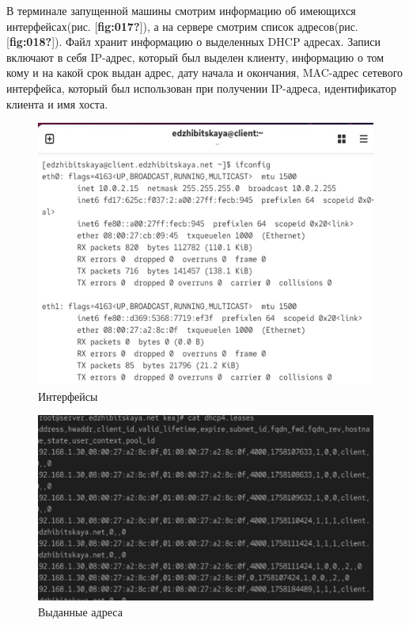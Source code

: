 \documentclass[
  english,
  russian,
  12pt,
  a4paper,
  DIV=11,
  numbers=noendperiod]{scrreprt}
\begin{document}
В терминале запущенной машины смотрим информацию об имеющихся
интерфейсах(рис. {[}\textbf{fig:017?}{]}), а на сервере смотрим список
адресов(рис. {[}\textbf{fig:018?}{]}). Файл хранит информацию о
выделенных DHCP адресах. Записи включают в себя IP-адрес, который был
выделен клиенту, информацию о том кому и на какой срок выдан адрес, дату
начала и окончания, MAC-адрес сетевого интерфейса, который был
использован при получении IP-адреса, идентификатор клиента и имя хоста.

\begin{figure}

{\centering \includegraphics[width=0.7\linewidth,height=\textheight,keepaspectratio]{image/17.jpg}

}

\caption{Интерфейсы}

\end{figure}%

\begin{figure}

{\centering \includegraphics[width=0.7\linewidth,height=\textheight,keepaspectratio]{image/18.jpg}

}

\caption{Выданные адреса}

\end{figure}%
\end{document}
